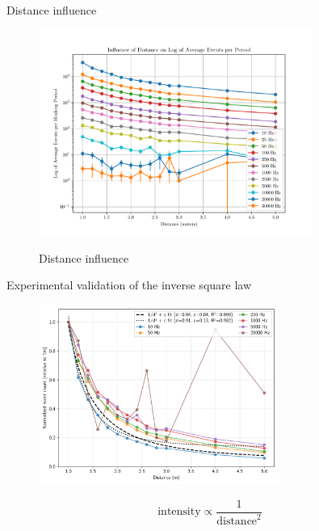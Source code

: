\documentclass{beamer}
\begin{document}
\begin{frame}{Distance influence}

\begin{figure}[H]
    \centering
    \includegraphics[width=0.8\textwidth]{../fig/semestral/distlog.pdf}
    \label{fig:dist_influence}
    \caption{Distance influence}
\end{figure}

\end{frame}

\begin{frame}{Experimental validation of the inverse square law}

    \begin{figure}
        \centering
        \includegraphics[width=0.70\textwidth]{../fig/pgfplot/build/inv_square.pdf}
        \label{fig:fit1}
    \end{figure}

    \vspace{-0.5cm}
    \begin{equation*}
        \text{intensity} \propto \frac{1}{\text{distance}^2}
    \end{equation*}

\end{frame}
\end{document}
